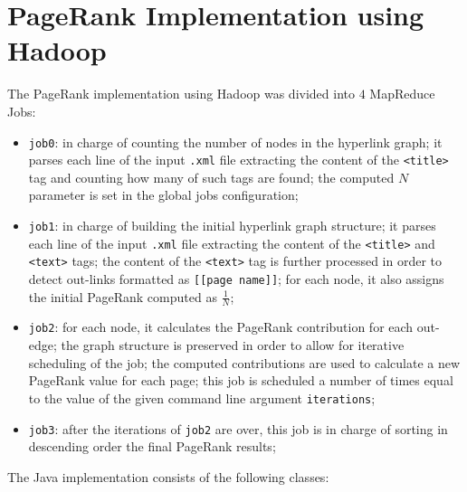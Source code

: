\documentclass[11pt,a4paper]{article}
\begin{document}
\section{PageRank Implementation using Hadoop}
The PageRank implementation using Hadoop was divided into $4$ MapReduce Jobs:
\begin{itemize}
    \item \texttt{job0}: in charge of counting the number of nodes in the hyperlink graph; it parses each line of the input \texttt{.xml} file extracting the content of the \texttt{<title>} tag and counting how many of such tags are found; the computed $N$ parameter is set in the global jobs configuration;
    \item \texttt{job1}: in charge of building the initial hyperlink graph structure; it parses each line of the input \texttt{.xml} file extracting the content of the \texttt{<title>} and \texttt{<text>} tags; the content of the \texttt{<text>} tag is further processed in order to detect out-links formatted as \texttt{[[page name]]}; for each node, it also assigns the initial PageRank computed as $\frac{1}{N}$;
    \item \texttt{job2}: for each node, it calculates the PageRank contribution for each out-edge; the graph structure is preserved in order to allow for iterative scheduling of the job; the computed contributions are used to calculate a new PageRank value for each page; this job is scheduled a number of times equal to the value of the given command line argument \texttt{iterations};
    \item \texttt{job3}: after the iterations of \texttt{job2} are over, this job is in charge of sorting in descending order the final PageRank results;
\end{itemize}
The Java implementation consists of the following classes:
\end{document}
